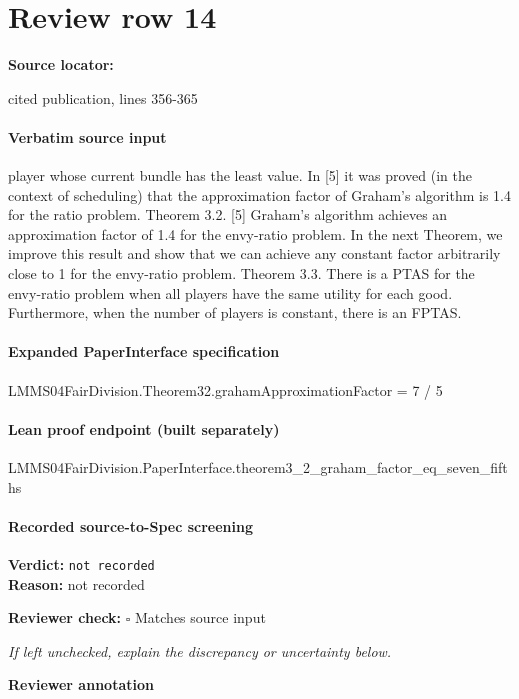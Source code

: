 \documentclass[10pt]{article}
\newcommand{\reviewerbox}{%
  \par\noindent\fbox{\parbox{0.96\linewidth}{\rule{0pt}{0.38in}}}\par
}
\newcommand{\reviewmatch}[1]{%
  \par\noindent\textbf{Reviewer check:} $\square$\; #1\par
  \noindent\emph{If left unchecked, explain the discrepancy or uncertainty below.}\par
}
\begin{document}
\section*{Review row 14}
\textbf{Source locator:} {\footnotesize\raggedright cited publication, lines 356-\allowbreak{}365\par}
\paragraph{Verbatim source input}
\begin{ReviewVerbatim}
player whose current bundle has the least value. In [5] it was
proved (in the context of scheduling) that the approximation
factor of Graham’s algorithm is 1.4 for the ratio problem.
Theorem 3.2. [5] Graham’s algorithm achieves an approximation factor of 1.4 for the envy-ratio problem.
In the next Theorem, we improve this result and show
that we can achieve any constant factor arbitrarily close to
1 for the envy-ratio problem.
Theorem 3.3. There is a PTAS for the envy-ratio problem when all players have the same utility for each good.
Furthermore, when the number of players is constant, there
is an FPTAS.
\end{ReviewVerbatim}


\paragraph{Expanded PaperInterface specification}
\begin{ReviewVerbatim}
LMMS04FairDivision.Theorem32.grahamApproximationFactor = 7 / 5
\end{ReviewVerbatim}

\paragraph{Lean proof endpoint (built separately)}\begin{ReviewVerbatim}
LMMS04FairDivision.PaperInterface.theorem3_2_graham_factor_eq_seven_fifths
\end{ReviewVerbatim}

\paragraph{Recorded source-to-Spec screening}
\textbf{Verdict:} \texttt{not recorded}
\\
\textbf{Reason:} not recorded
\reviewmatch{Matches source input}
\noindent\textbf{Reviewer annotation}\par
\reviewerbox
\clearpage
\hypertarget{source-claim-c094e7d861709ddc}{}
\end{document}
